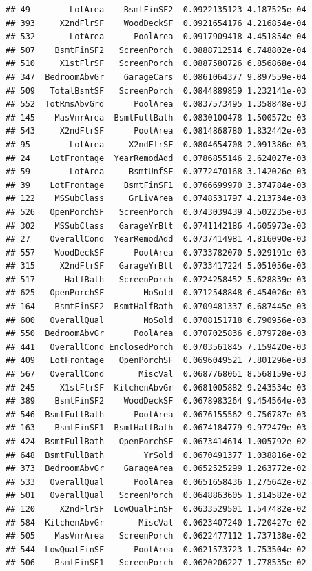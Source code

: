 \documentclass[american,]{article}
\theoremstyle{definition}
\theoremstyle{definition}
\theoremstyle{definition}
\theoremstyle{remark}
\begin{document}
\begin{verbatim}
## 49        LotArea    BsmtFinSF2  0.0922135123 4.187525e-04
## 393     X2ndFlrSF    WoodDeckSF  0.0921654176 4.216854e-04
## 532       LotArea      PoolArea  0.0917909418 4.451854e-04
## 507    BsmtFinSF2   ScreenPorch  0.0888712514 6.748802e-04
## 510     X1stFlrSF   ScreenPorch  0.0887580726 6.856868e-04
## 347  BedroomAbvGr    GarageCars  0.0861064377 9.897559e-04
## 509   TotalBsmtSF   ScreenPorch  0.0844889859 1.232141e-03
## 552  TotRmsAbvGrd      PoolArea  0.0837573495 1.358848e-03
## 145    MasVnrArea  BsmtFullBath  0.0830100478 1.500572e-03
## 543     X2ndFlrSF      PoolArea  0.0814868780 1.832442e-03
## 95        LotArea     X2ndFlrSF  0.0804654708 2.091386e-03
## 24    LotFrontage  YearRemodAdd  0.0786855146 2.624027e-03
## 59        LotArea     BsmtUnfSF  0.0772470168 3.142026e-03
## 39    LotFrontage    BsmtFinSF1  0.0766699970 3.374784e-03
## 122    MSSubClass     GrLivArea  0.0748531797 4.213734e-03
## 526   OpenPorchSF   ScreenPorch  0.0743039439 4.502235e-03
## 302    MSSubClass   GarageYrBlt  0.0741142186 4.605973e-03
## 27    OverallCond  YearRemodAdd  0.0737414981 4.816090e-03
## 557    WoodDeckSF      PoolArea  0.0733782070 5.029191e-03
## 315     X2ndFlrSF   GarageYrBlt  0.0733417224 5.051056e-03
## 517      HalfBath   ScreenPorch  0.0724258452 5.628839e-03
## 625   OpenPorchSF        MoSold  0.0712548848 6.454026e-03
## 164    BsmtFinSF2  BsmtHalfBath  0.0709481337 6.687445e-03
## 600   OverallQual        MoSold  0.0708151718 6.790956e-03
## 550  BedroomAbvGr      PoolArea  0.0707025836 6.879728e-03
## 441   OverallCond EnclosedPorch  0.0703561845 7.159420e-03
## 409   LotFrontage   OpenPorchSF  0.0696049521 7.801296e-03
## 567   OverallCond       MiscVal  0.0687768061 8.568159e-03
## 245     X1stFlrSF  KitchenAbvGr  0.0681005882 9.243534e-03
## 389    BsmtFinSF2    WoodDeckSF  0.0678983264 9.454564e-03
## 546  BsmtFullBath      PoolArea  0.0676155562 9.756787e-03
## 163    BsmtFinSF1  BsmtHalfBath  0.0674184779 9.972479e-03
## 424  BsmtFullBath   OpenPorchSF  0.0673414614 1.005792e-02
## 648  BsmtFullBath        YrSold  0.0670491377 1.038816e-02
## 373  BedroomAbvGr    GarageArea  0.0652525299 1.263772e-02
## 533   OverallQual      PoolArea  0.0651658436 1.275642e-02
## 501   OverallQual   ScreenPorch  0.0648863605 1.314582e-02
## 120     X2ndFlrSF  LowQualFinSF  0.0633529501 1.547482e-02
## 584  KitchenAbvGr       MiscVal  0.0623407240 1.720427e-02
## 505    MasVnrArea   ScreenPorch  0.0622477112 1.737138e-02
## 544  LowQualFinSF      PoolArea  0.0621573723 1.753504e-02
## 506    BsmtFinSF1   ScreenPorch  0.0620206227 1.778535e-02

\end{verbatim}
\end{document}

